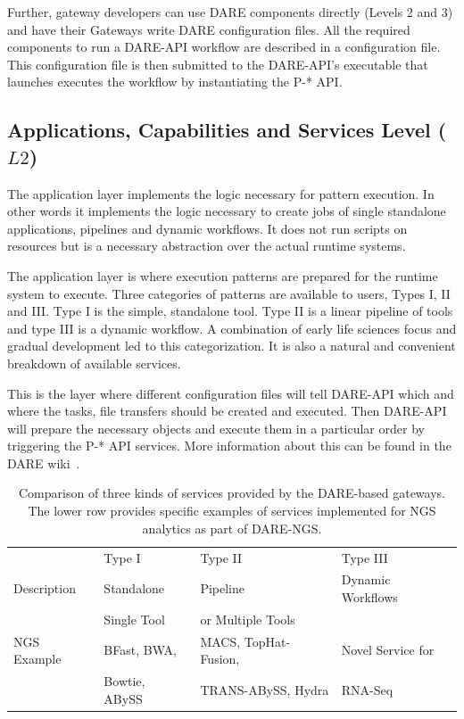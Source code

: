 \documentclass[]{svjour3}
\begin{document}
Further, gateway developers can use DARE components directly (Levels 2 and 3)
and have their Gateways write DARE configuration files.  All the required components to run a
DARE-API workflow are described in  a configuration file. This configuration file is then
submitted to the DARE-API's executable that launches executes the workflow by instantiating the P-* API.


\subsection{Applications, Capabilities and Services Level ($L2$)}

The application layer implements the logic necessary for pattern
execution. In other words it implements the logic necessary to
create jobs of single standalone applications, pipelines and
dynamic workflows. It does not run scripts on resources but is
a necessary abstraction over the actual runtime systems.

The application layer is where execution patterns are prepared for the
runtime system to execute. Three categories of patterns are available
to users, Types I, II and III. Type I is the simple, standalone tool. 
Type II is a linear pipeline of tools and type III is a dynamic workflow.
A combination of early life sciences focus and gradual development
led to this categorization. It is also a natural and convenient
breakdown of available services.

This is the layer where different configuration files will  tell
DARE-API which and where the tasks, file transfers should be created and executed. 
Then DARE-API will prepare the necessary objects and execute them in a particular order
by triggering the P-* API services. More information about this can be found in the DARE wiki~\cite{dare_api_web}.


\begin{table}[!h]
\centering
\begin{tabular}{| l | l | l | l |} \hline \rowcolor[rgb]{0.8,0.8,0.8} &
Type I & Type II & Type III \\ Description & Standalone & Pipeline & Dynamic  Workflows\\ 
& Single Tool & or Multiple Tools & \\\hline 
NGS Example & BFast, BWA, & MACS, TopHat-Fusion, &  Novel Service for 
 \\
 & Bowtie, ABySS & TRANS-ABySS, Hydra & RNA-Seq \\
\hline
\end{tabular}
\caption{Comparison of three kinds of services provided by the
 DARE-based gateways. The lower row provides specific examples of
 services implemented for NGS analytics as part of DARE-NGS.}
\label{table:three-type-service}
\end{table}
\end{document}
